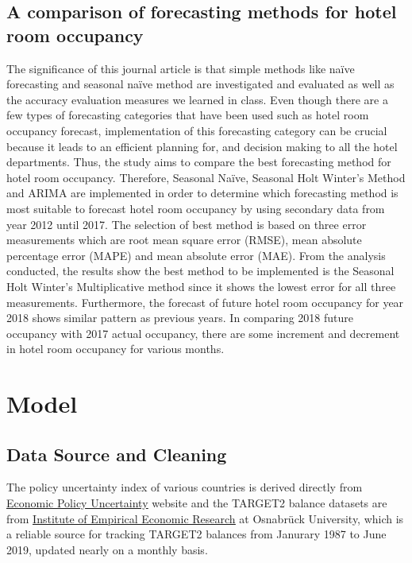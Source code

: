 \documentclass[12pt]{article}
\begin{document}
\subsection{A comparison of forecasting methods for hotel room occupancy}
The significance of this journal article is that simple methods like naïve forecasting and seasonal naïve method are investigated and evaluated as well as the accuracy evaluation measures we learned in class. Even though there are a few types of forecasting categories that have been used such as hotel room occupancy forecast, implementation of this forecasting category can be crucial because it leads to an efficient planning for, and decision making to all the hotel departments. Thus, the study aims to compare the best forecasting method for hotel room occupancy. Therefore, Seasonal Naïve, Seasonal Holt Winter’s Method and ARIMA are implemented in order to determine which forecasting method is most suitable to forecast hotel room occupancy by using secondary data from year 2012 until 2017. The selection of best method is based on three error measurements which are root mean square error (RMSE), mean absolute percentage error (MAPE) and mean absolute error (MAE). From the analysis conducted, the results show the best method to be implemented is the Seasonal Holt Winter’s Multiplicative method since it shows the lowest error for all three measurements. Furthermore, the forecast of future hotel room occupancy for year 2018 shows similar pattern as previous years. In comparing 2018 future occupancy with 2017 actual occupancy, there are some increment and decrement in hotel room occupancy for various months.

\section{Model} \label{sec:model}
\subsection{Data Source and Cleaning}
The policy uncertainty index of various countries is derived directly from \href{https://www.policyuncertainty.com/monetary.html}{\underline{Economic Policy Uncertainty}} website and the TARGET2 balance datasets are from \href{http://www.eurocrisismonitor.com}{\underline{Institute of Empirical Economic Research}} at Osnabrück University, which is a reliable source for tracking TARGET2 balances from Janurary 1987 to June 2019, updated nearly on a monthly basis. 
\end{document}
